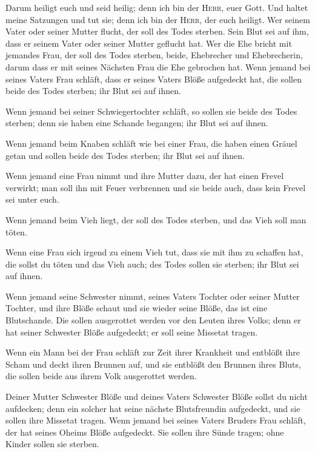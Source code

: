  Darum heiligt euch und seid heilig; denn ich bin der
\textsc{Herr}, euer Gott.  Und haltet meine Satzungen und
tut sie; denn ich bin der \textsc{Herr}, der euch heiligt.
 Wer seinem Vater oder seiner Mutter flucht, der soll des
Todes sterben. Sein Blut sei auf ihm, dass er seinem Vater oder seiner
Mutter geflucht hat.  Wer die Ehe bricht mit jemandes
Frau, der soll des Todes sterben, beide, Ehebrecher und Ehebrecherin,
darum dass er mit seines Nächsten Frau die Ehe gebrochen hat.
 Wenn jemand bei seines Vaters Frau schläft, dass er
seines Vaters Blöße aufgedeckt hat, die sollen beide des Todes sterben;
ihr Blut sei auf ihnen.

 Wenn jemand bei seiner Schwiegertochter schläft, so
sollen sie beide des Todes sterben; denn sie haben eine Schande
begangen; ihr Blut sei auf ihnen.

 Wenn jemand beim Knaben schläft wie bei einer Frau, die
haben einen Gräuel getan und sollen beide des Todes sterben; ihr Blut
sei auf ihnen.

 Wenn jemand eine Frau nimmt und ihre Mutter dazu, der
hat einen Frevel verwirkt; man soll ihn mit Feuer verbrennen und sie
beide auch, dass kein Frevel sei unter euch.

 Wenn jemand beim Vieh liegt, der soll des Todes sterben,
und das Vieh soll man töten.

 Wenn eine Frau sich irgend zu einem Vieh tut, dass sie
mit ihm zu schaffen hat, die sollst du töten und das Vieh auch; des
Todes sollen sie sterben; ihr Blut sei auf ihnen.

 Wenn jemand seine Schwester nimmt, seines Vaters Tochter
oder seiner Mutter Tochter, und ihre Blöße schaut und sie wieder seine
Blöße, das ist eine Blutschande. Die sollen ausgerottet werden vor den
Leuten ihres Volks; denn er hat seiner Schwester Blöße aufgedeckt; er
soll seine Missetat tragen.

 Wenn ein Mann bei der Frau schläft zur Zeit ihrer
Krankheit und entblößt ihre Scham und deckt ihren Brunnen auf, und sie
entblößt den Brunnen ihres Bluts, die sollen beide aus ihrem Volk
ausgerottet werden.

 Deiner Mutter Schwester Blöße und deines Vaters
Schwester Blöße sollst du nicht aufdecken; denn ein solcher hat seine
nächste Blutsfreundin aufgedeckt, und sie sollen ihre Missetat tragen.
 Wenn jemand bei seines Vaters Bruders Frau schläft, der
hat seines Oheims Blöße aufgedeckt. Sie sollen ihre Sünde tragen; ohne
Kinder sollen sie sterben.

